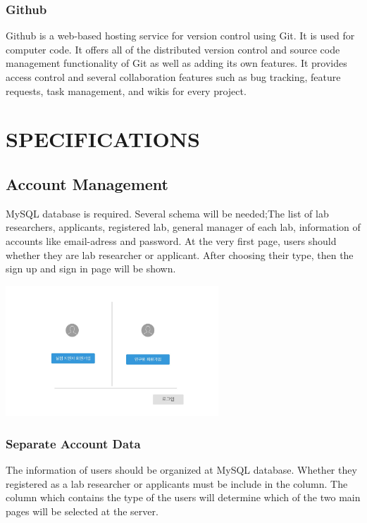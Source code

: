 \documentclass[letterpaper, 10 pt, conference]{ieeeconf}  %
\begin{document}
\subsubsection{Github}
Github is a web-based hosting service for version control using Git. It is used for computer code. It offers all of the distributed version control and source code management functionality of Git as well as adding its own features. It provides access control and several collaboration features such as bug tracking, feature requests, task management, and wikis for every project.\\



\section{SPECIFICATIONS}

\subsection{Account Management}


MySQL database is required. Several schema will be needed;The list of lab researchers, applicants, registered lab, general manager of each lab, information of accounts like email-adress and password. At the very first page, users should whether they are lab researcher or applicant. After choosing their type, then the sign up and sign in page will be shown.
\graphicspath{{./Oven/}}

\includegraphics[width=8cm]{01_firstpage}


\subsubsection{Separate Account Data}
The information of users should be organized at MySQL database. Whether they registered as a lab researcher or applicants must be include in the column. The column which contains the type of the users will determine which of the two main pages will be selected at the server. 
\end{document}
